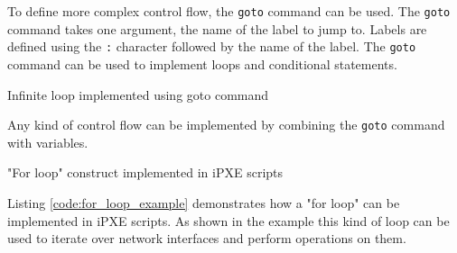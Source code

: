 \documentclass[../main.tex]{subfiles}
\begin{document}
To define more complex control flow, the \texttt{goto} command can be used.
The \texttt{goto} command takes one argument, the name of the label to jump to.
Labels are defined using the \texttt{:} character followed by the name of the label.
The \texttt{goto} command can be used to implement loops and conditional statements.

\begin{listing}[H]
  \caption{Infinite loop implemented using goto command}
\end{listing}

Any kind of control flow can be implemented by combining the \texttt{goto} command with variables.

\begin{listing}[H]
  \caption{"For loop" construct implemented in iPXE scripts}
  \label{code:for_loop_example}
\end{listing}

Listing \ref{code:for_loop_example} demonstrates how a "for loop" can be implemented in iPXE scripts. As shown in the example this kind of loop can be used to
iterate over network interfaces and perform operations on them.
\end{document}
